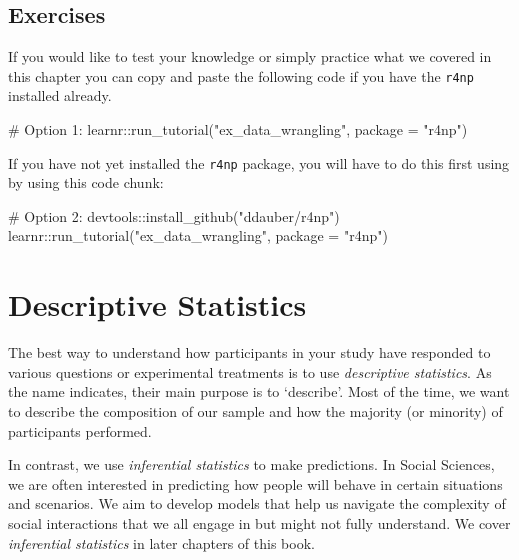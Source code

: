 \documentclass[
  letterpaper,
]{krantz}
\makeatletter
\newenvironment{Shaded}{\begin{snugshade}}{\end{snugshade}}
\newcommand{\AttributeTok}[1]{\textcolor[rgb]{0.40,0.45,0.13}{#1}}
\newcommand{\CommentTok}[1]{\textcolor[rgb]{0.37,0.37,0.37}{#1}}
\newcommand{\FunctionTok}[1]{\textcolor[rgb]{0.28,0.35,0.67}{#1}}
\newcommand{\NormalTok}[1]{\textcolor[rgb]{0.00,0.23,0.31}{#1}}
\newcommand{\SpecialCharTok}[1]{\textcolor[rgb]{0.37,0.37,0.37}{#1}}
\newcommand{\StringTok}[1]{\textcolor[rgb]{0.13,0.47,0.30}{#1}}
\newenvironment{kframe}{%
\medskip{}
\setlength{\fboxsep}{.8em}
 \def\at@end@of@kframe{}%
 \ifinner\ifhmode%
  \def\at@end@of@kframe{\end{minipage}}%
  \begin{minipage}{\columnwidth}%
 \fi\fi%
 \def\FrameCommand##1{\hskip\@totalleftmargin \hskip-\fboxsep
 \colorbox{shadecolor}{##1}\hskip-\fboxsep
     \hskip-\linewidth \hskip-\@totalleftmargin \hskip\columnwidth}%
 \MakeFramed {\advance\hsize-\width
   \@totalleftmargin\z@ \linewidth\hsize
   \@setminipage}}%
 {\par\unskip\endMakeFramed%
 \at@end@of@kframe}
\renewenvironment{Shaded}{\begin{kframe}}{\end{kframe}}
\makeatother
\begin{document}
\section{Exercises}\label{exercises}

If you would like to test your knowledge or simply practice what we
covered in this chapter you can copy and paste the following code if you
have the \texttt{r4np} installed already.

\begin{Shaded}
\begin{Highlighting}[]
\CommentTok{\# Option 1:}
\NormalTok{learnr}\SpecialCharTok{::}\FunctionTok{run\_tutorial}\NormalTok{(}\StringTok{"ex\_data\_wrangling"}\NormalTok{, }\AttributeTok{package =} \StringTok{"r4np"}\NormalTok{)}
\end{Highlighting}
\end{Shaded}

If you have not yet installed the \texttt{r4np} package, you will have
to do this first using by using this code chunk:

\begin{Shaded}
\begin{Highlighting}[]
\CommentTok{\# Option 2:}
\NormalTok{devtools}\SpecialCharTok{::}\FunctionTok{install\_github}\NormalTok{(}\StringTok{"ddauber/r4np"}\NormalTok{)}
\NormalTok{learnr}\SpecialCharTok{::}\FunctionTok{run\_tutorial}\NormalTok{(}\StringTok{"ex\_data\_wrangling"}\NormalTok{, }\AttributeTok{package =} \StringTok{"r4np"}\NormalTok{)}
\end{Highlighting}
\end{Shaded}


\chapter{Descriptive Statistics}\label{sec-descriptive-statistics}

The best way to understand how participants in your study have responded
to various questions or experimental treatments is to use
\emph{descriptive statistics}. As the name indicates, their main purpose
is to `describe'. Most of the time, we want to describe the composition
of our sample and how the majority (or minority) of participants
performed.

In contrast, we use \emph{inferential statistics} to make predictions.
In Social Sciences, we are often interested in predicting how people
will behave in certain situations and scenarios. We aim to develop
models that help us navigate the complexity of social interactions that
we all engage in but might not fully understand. We cover
\emph{inferential statistics} in later chapters of this book.
\end{document}
